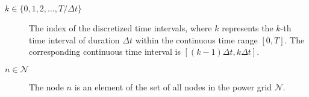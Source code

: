 \clearpage

\begin{description}
	\item[$k \in \{0, 1, 2, \ldots, T/\Delta t\}$] The index of the discretized time intervals, where $k$ represents
	the $k$-th time interval of duration $\Delta t$ within the continuous time range
	$[0, T]$. The corresponding continuous time interval is $[(k-1)\Delta t, k\Delta t]$.
	\item[$n \in \mathcal{N}$] The node $n$ is an element of the set of all nodes
	in the power grid $\mathcal{N}$.
\end{description}


